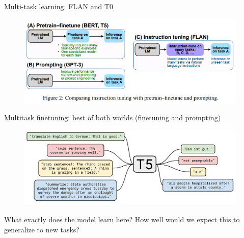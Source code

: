 \begin{frame}{Multi-task learning: FLAN and T0}

\vfill
	
	\begin{figure}
		\centering
		\includegraphics[width = 11cm]{figure/81-flan.png}\\ 
	\end{figure}

\vfill

\end{frame}


\begin{frame}{Multitask finetuning: best of both worlds
(finetuning and  prompting)}

\vfill
	
	\begin{figure}
		\centering
		\includegraphics[width = 11cm]{figure/62-t5.png}\\ 
	\end{figure}

\pause

     \ques What exactly does the model learn here? How well
    would we expect this to generalize to new tasks?


\vfill

\end{frame}

